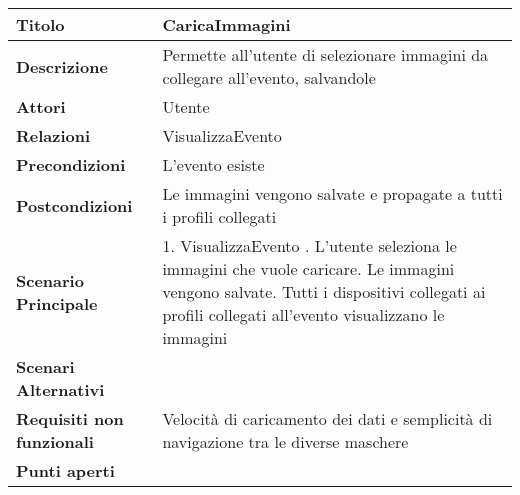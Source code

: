 \begin{tabular} {|P{4.5cm}|P{12.5cm}|}
  \hline
  \textbf{Titolo}                   & CaricaImmagini                                                                       \\
  \hline
  \textbf{Descrizione}              & Permette all'utente di selezionare immagini da collegare all'evento, salvandole      \\
  \hline
  \textbf{Attori}                   & Utente                                                                               \\
  \hline
  \textbf{Relazioni}                & VisualizzaEvento                                                                     \\
  \hline
  \textbf{Precondizioni}            & L'evento esiste                                                                      \\
  \hline
  \textbf{Postcondizioni}           & Le immagini vengono salvate e propagate a tutti i profili collegati                  \\
  \hline
  \textbf{Scenario Principale}      & 1. VisualizzaEvento . L'utente seleziona le immagini che vuole caricare. Le immagini vengono salvate. Tutti i dispositivi collegati ai profili collegati all'evento visualizzano le immagini                                \\
  \textbf{Scenari Alternativi}      &                                                                                      \\
  \hline
  \textbf{Requisiti non funzionali} & Velocità di caricamento dei dati e semplicità di navigazione tra le diverse maschere \\
  \hline
  \textbf{Punti aperti}             &                                                                                      \\
  \hline
\end{tabular}
\hfill
\break

